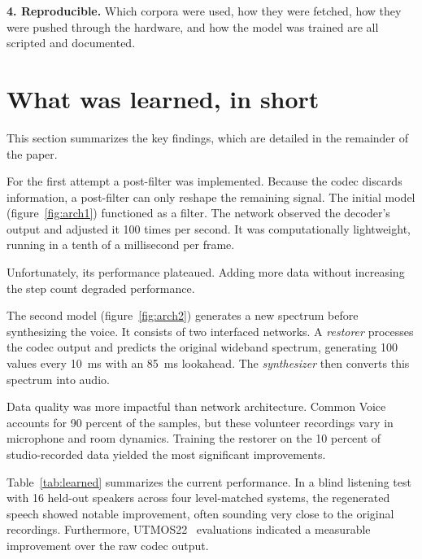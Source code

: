\documentclass[10pt,twocolumn,a4paper]{article}
\begin{document}
\textbf{4. Reproducible.} Which corpora were used, how they were
fetched, how they were pushed through the hardware, and how the model
was trained are all scripted and documented.

\section{What was learned, in short}
\label{sec:learned}

This section summarizes the key findings, which are detailed in the
remainder of the paper.

For the first attempt a post-filter was implemented.
Because the codec discards information, a post-filter can only reshape the remaining signal.
The initial model (figure~\ref{fig:arch1}) functioned as a filter.
The network observed the decoder's output and adjusted it 100 times per second.
It was computationally lightweight, running in a tenth of a millisecond per frame.

Unfortunately, its performance plateaued. Adding more data without increasing the
step count degraded performance.

The second model (figure~\ref{fig:arch2}) generates a new spectrum
before synthesizing the voice. It consists of two interfaced networks. A \emph{restorer}
processes the codec output and predicts the original wideband
spectrum, generating 100 values every \SI{10}{ms} with an \SI{85}{ms}
lookahead. The \emph{synthesizer} then converts this spectrum
into audio.

Data quality was more impactful than network architecture. Common
Voice accounts for 90 percent of the samples, but these volunteer
recordings vary in microphone and room dynamics. Training the
restorer on the 10 percent of studio-recorded data yielded the most
significant improvements.

Table~\ref{tab:learned} summarizes the current performance. In a
blind listening test with 16 held-out speakers across four
level-matched systems, the regenerated speech showed notable
improvement, often sounding very close to the original recordings.
Furthermore, UTMOS22~\cite{saeki2022utmos} evaluations indicated
a measurable improvement over the raw codec output.
\end{document}
